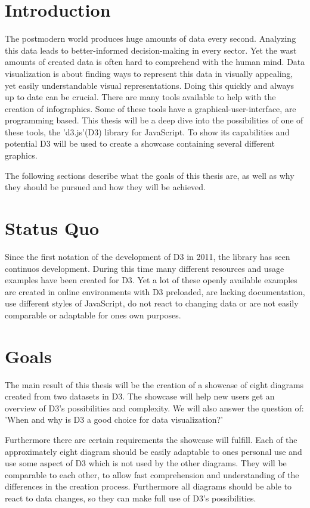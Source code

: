 \documentclass[
a4paper,     %
12pt         %
]{scrartcl}  %
\begin{document}
\section{Introduction}
The postmodern world produces huge amounts of data every second. Analyzing this data leads to better-informed decision-making in every sector. Yet the wast amounts of created data is often hard to comprehend with the human mind. Data visualization is about finding ways to represent this data in visually appealing, yet easily understandable visual representations. Doing this quickly and always up to date can be crucial. There are many tools available to help with the creation of infographics. Some of these tools have a graphical-user-interface, are programming based. This thesis will be a deep dive into the possibilities of one of these tools, the 'd3.js'(D3) library for JavaScript. To show its capabilities and potential D3 will be used to create a showcase containing several different graphics.

The following sections describe what the goals of this thesis are, as well as why they should be pursued and how they will be achieved.

\section{Status Quo}
Since the first notation of the development of D3 in 2011, the library has seen continuos development. During this time many different resources and usage examples have been created for D3. Yet a lot of these openly available examples are created in online environments with D3 preloaded, are lacking documentation, use different styles of JavaScript, do not react to changing data or are not easily comparable or adaptable for ones own purposes.

\section{Goals}
The main result of this thesis will be the creation of a showcase of eight diagrams created from two datasets in D3. The showcase will help new users get an overview of D3's possibilities and complexity.
We will also answer the question of: 'When and why is D3 a good choice for data visualization?'

Furthermore there are certain requirements the showcase will fulfill. Each of the approximately eight diagram should be easily adaptable to ones personal use and use some aspect of D3 which is not used by the other diagrams. They will be comparable to each other, to allow fast comprehension and understanding of the differences in the creation process. Furthermore all diagrams should be able to react to data changes, so they can make full use of D3's possibilities.
\end{document}
